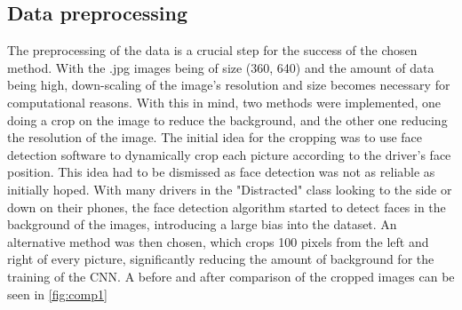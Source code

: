 \subsection{Data preprocessing}
The preprocessing of the data is a crucial step for the success of the chosen method. With the .jpg images being of size (360, 640) and the amount of data being high, down-scaling of the image's resolution and size becomes necessary for computational reasons. With this in mind, two methods were implemented, one doing a crop on the image to reduce the background, and the other one reducing the resolution of the image. 
The initial idea for the cropping was to use face detection software to dynamically crop each picture according to the driver's face position. This idea had to be dismissed as face detection was not as reliable as initially hoped. With many drivers in the "Distracted" class looking to the side or down on their phones, the face detection algorithm started to detect faces in the background of the images, introducing a large bias into the dataset. 
An alternative method was then chosen, which crops 100 pixels from the left and right of every picture, significantly reducing the amount of background for the training of the CNN. A before and after comparison of the cropped images can be seen in \autoref{fig:comp1}
